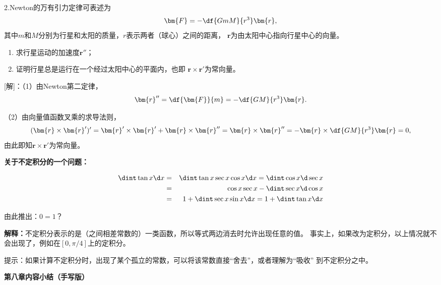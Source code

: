 \bs

2.Newton的万有引力定律可表述为
  $$\bm{F}=-\df{GmM}{r^3}\bm{r},$$
  其中$m$和$M$分别为行星和太阳的质量，$r$表示两者（球心）之间的距离，
  $\bm{r}$为由太阳中心指向行星中心的向量。
  \begin{enumerate}[(1)]
    \setlength{\itemindent}{1cm}
    \item 求行星运动的加速度$\bm{r}''$；
    \item 证明行星总是运行在一个经过太阳中心的平面内，也即
    $\bm{r}\times\bm{r}'$为常向量。
  \end{enumerate}

[解]：（1）由Newton第二定律，
$$\bm{r}''=\df{\bm{F}}{m}=-\df{GM}{r^3}\bm{r}.$$

（2）由向量值函数叉乘的求导法则，
$$
	(\bm{r}\times\bm{r}')'
	=\bm{r}'\times\bm{r}'+\bm{r}\times\bm{r}''
	=\bm{r}\times\bm{r}''=-\bm{r}\times\df{GM}{r^3}\bm{r}=0,
$$
由此即知$\bm{r}\times\bm{r}'$为常向量。\fin

\ifvisible

\newpage

{\bf 关于不定积分的一个问题：}

\begin{eqnarray*}
	\dint\tan x\d x & = & \dint\tan x\sec x\cos x\d x=\dint\cos x\d\sec x\\
	& = & \cos x\sec x-\dint\sec x\d\cos x\\
	& = & 1+\dint\sec x\sin x\d x
	= 1+\dint\tan x\d x
\end{eqnarray*}

由此推出：$0=1$？

{\bf 解释：}不定积分表示的是（之间相差常数的）一类函数，所以等式两边消去时允许出现任意的值。
事实上，如果改为定积分，以上情况就不会出现了，例如在$[0,\pi/4]$上的定积分。

提示：如果计算不定积分时，出现了某个孤立的常数，可以将该常数直接“舍去”，或者理解为“吸收”
到不定积分之中。

\newpage

{\bf 第八章内容小结（手写版）}

